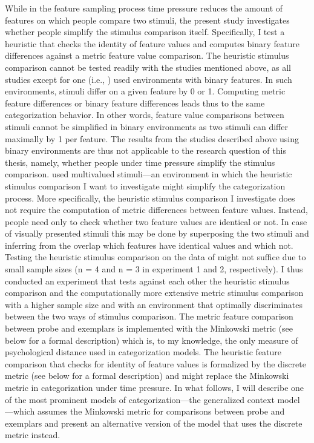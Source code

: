 \documentclass[a4paper,man,natbib]{apa6}
\begin{document}
While in the feature sampling process time pressure reduces the amount of features on which people compare two stimuli, the present study investigates whether people simplify the stimulus comparison itself. Specifically, I test a heuristic that checks the identity of feature values and computes binary feature differences against a metric feature value comparison. The heuristic stimulus comparison cannot be tested readily with the studies mentioned above, as all studies except for one (i.e., \citealp{lamberts1997fast}) used environments with binary features. In such environments, stimuli differ on a given feature by 0 or 1. Computing metric feature differences or binary feature differences leads thus to the same categorization behavior. In other words, feature value comparisons between stimuli cannot be simplified in binary environments as two stimuli can differ maximally by 1 per feature. The results from the studies described above using binary environments are thus not applicable to the research question of this thesis, namely, whether people under time pressure simplify the stimulus comparison. \cite{lamberts1997fast} used multivalued stimuli---an environment in which the heuristic stimulus comparison I want to investigate might simplify the categorization process. More specifically, the heuristic stimulus comparison I investigate does not require the computation of metric differences between feature values. Instead, people need only to check whether two feature values are identical or not. In case of visually presented stimuli this may be done by superposing the two stimuli and inferring from the overlap which features have identical values and which not. Testing the heuristic stimulus comparison on the data of \citeauthor{lamberts1997fast} might not suffice due to small sample sizes (n = 4 and n = 3 in experiment 1 and 2, respectively). I thus conducted an experiment that tests against each other the heuristic stimulus comparison and the computationally more extensive metric stimulus comparison with a higher sample size and with an environment that optimally discriminates between the two ways of stimulus comparison. The metric feature comparison between probe and exemplars is implemented with the Minkowski metric (see below for a formal description) which is, to my knowledge, the only measure of psychological distance used in categorization models. The heuristic feature comparison that checks for identity of feature values is formalized by the discrete metric (see below for a formal description) and might replace the Minkowski metric in categorization under time pressure. In what follows, I will describe one of the most prominent models of categorization---the generalized context model \citep{nosofsky1986attention}---which assumes the Minkowski metric for comparisons between probe and exemplars and present an alternative version of the model that uses the discrete metric instead.
\end{document}
